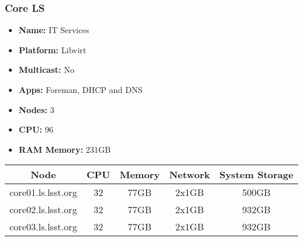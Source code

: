 \subsubsection{Core LS}
\begin{itemize}
  \itemsep0em 
  \item \textbf{Name:}      IT Services
  \item \textbf{Platform:}  Libvirt
  \item \textbf{Multicast:}  No
  \item \textbf{Apps:}       Foreman, DHCP and DNS
  \item \textbf{Nodes:}      3
  \item \textbf{CPU:}        96
  \item \textbf{RAM Memory:} 231GB
\end{itemize}
\begin{center}
  \small
  \begin{tabular}{||c c c c c||} 
    \hline
    \textbf{Node} & \textbf{CPU} & \textbf{Memory} & \textbf{Network} & \textbf{System Storage} \\ [0.5ex]
    \hline
    core01.ls.lsst.org & 32 & 77GB & 2x1GB & 500GB \\
    \hline
    core02.ls.lsst.org & 32 & 77GB & 2x1GB & 932GB \\
    \hline
    core03.ls.lsst.org & 32 & 77GB & 2x1GB & 932GB \\
    \hline
  \end{tabular}
\end{center}

